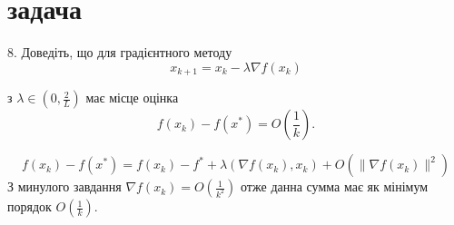 \section{задача}
\begin{tcolorbox}[title=Умова]
8. Доведіть, що для градієнтного методу
$$
x_{k+1}=x_k-\lambda \nabla f\left(x_k\right)
$$

з $\lambda \in\left(0, \frac{2}{L}\right)$ має місце оцінка
$$
f\left(x_k\right)-f\left(x^*\right)=O\left(\frac{1}{k}\right) .
$$
\end{tcolorbox}


$$f(x_k) - f(x^*) = f(x_k) - f^* + \lambda (\nabla f(x_k), x_k) + 
O(\|\nabla f(x_k)\|^2) $$
З минулого завдання $\nabla f(x_k) = O(\frac{1}{k^2})$ отже данна сумма має як мінімум порядок $O(\frac{1}{k})$.
